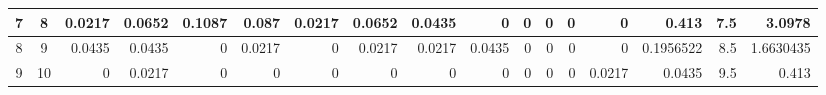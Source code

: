 \begin{table}[hb]
\begin{adjustbox}{width = \textwidth, center}
\begin{tabular}{|cc|r|r|r|r|r|r|r|r|r|r|r|r|r|r|r|}
            \cellcolor[HTML]{C9DAF8}7              & \cellcolor[HTML]{EBF1FC}8              & \cellcolor[HTML]{DEF2E8}0.0217                 & \cellcolor[HTML]{9BD7B9}0.0652                 & \cellcolor[HTML]{57BB8A}0.1087                 & \cellcolor[HTML]{79C9A2}0.087                  & \cellcolor[HTML]{DEF2E8}0.0217                 & \cellcolor[HTML]{9BD7B9}0.0652                 & \cellcolor[HTML]{BCE4D1}0.0435                 & \cellcolor[HTML]{FFFFFF}0                       & \cellcolor[HTML]{FFFFFF}0                       & \cellcolor[HTML]{FFFFFF}0                       & \cellcolor[HTML]{FFFFFF}0                       & \cellcolor[HTML]{FFFFFF}0                       & \cellcolor[HTML]{D9D2E9}0.413                                                   & \cellcolor[HTML]{D9D2E9}7.5                                             & \cellcolor[HTML]{D9D2E9}3.0978                                                        \\ \hline
            \cellcolor[HTML]{C9DAF8}8              & \cellcolor[HTML]{EBF1FC}9              & \cellcolor[HTML]{BCE4D1}0.0435                 & \cellcolor[HTML]{BCE4D1}0.0435                 & \cellcolor[HTML]{FFFFFF}0                      & \cellcolor[HTML]{DEF2E8}0.0217                 & \cellcolor[HTML]{FFFFFF}0                      & \cellcolor[HTML]{DEF2E8}0.0217                 & \cellcolor[HTML]{DEF2E8}0.0217                 & \cellcolor[HTML]{BCE4D1}0.0435                  & \cellcolor[HTML]{FFFFFF}0                       & \cellcolor[HTML]{FFFFFF}0                       & \cellcolor[HTML]{FFFFFF}0                       & \cellcolor[HTML]{FFFFFF}0                       & \cellcolor[HTML]{D9D2E9}0.1956522                                               & \cellcolor[HTML]{D9D2E9}8.5                                             & \cellcolor[HTML]{D9D2E9}1.6630435                                                     \\ \hline
            \rowcolor[HTML]{FFFFFF} 
            \cellcolor[HTML]{C9DAF8}9              & \cellcolor[HTML]{EBF1FC}10             & 0                                              & \cellcolor[HTML]{DEF2E8}0.0217                 & 0                                              & 0                                              & 0                                              & 0                                              & 0                                              & 0                                               & 0                                               & 0                                               & 0                                               & \cellcolor[HTML]{DEF2E8}0.0217                  & \cellcolor[HTML]{D9D2E9}0.0435                                                  & \cellcolor[HTML]{D9D2E9}9.5                                             & \cellcolor[HTML]{D9D2E9}0.413                                                         \\ \hline

\end{tabular}
\end{adjustbox}
\end{table}
